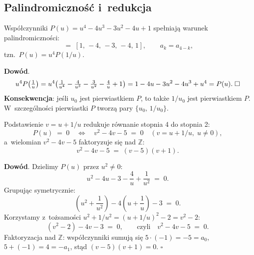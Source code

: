 \subsection{Palindromiczno\'s\'c i~redukcja}\label{app:T2-palindrome}

\begin{proposition}\label{prop:T2-palindrome}
Wsp\'o\l{}czynniki $P(u) = u^4 - 4u^3 - 3u^2 - 4u + 1$ spe\l{}niaj\k{a}
warunek palindromiczno\'sci:
\begin{equation}
  [a_4, a_3, a_2, a_1, a_0] \;=\; [1,\,-4,\,-3,\,-4,\,1],
  \qquad a_k = a_{4-k},
\end{equation}
tzn.\ $P(u) = u^4 P(1/u)$.

\textbf{Dow\'od}.
\[
  u^4 P\!\left(\tfrac{1}{u}\right)
    = u^4\!\left(\tfrac{1}{u^4} - \tfrac{4}{u^3} - \tfrac{3}{u^2}
      - \tfrac{4}{u} + 1\right)
    = 1 - 4u - 3u^2 - 4u^3 + u^4
    = P(u). \;\hfill\square
\]
\textbf{Konsekwencja}: je\'sli $u_0$ jest pierwiastkiem $P$, to tak\.ze
$1/u_0$ jest pierwiastkiem $P$.
W~szczeg\'olno\'sci pierwiastki $P$ tworz\k{a} pary
$\{u_0,\, 1/u_0\}$.
\end{proposition}

\begin{theorem}\label{thm:T2-reduction}
Podstawienie $v = u + 1/u$ redukuje r\'ownanie stopnia 4 do stopnia 2:
\begin{equation}\label{eq:T2-vred}
  P(u) \;=\; 0 \quad\Longleftrightarrow\quad
  v^2 - 4v - 5 \;=\; 0
  \quad (v = u + 1/u,\; u \neq 0),
\end{equation}
a~wielomian $v^2-4v-5$ faktoryzuje si\k{e} nad $\mathbb{Z}$:
\begin{equation}\label{eq:T2-vfactor}
  v^2 - 4v - 5 \;=\; (v-5)(v+1).
\end{equation}

\textbf{Dow\'od}.
Dzielimy $P(u)$ przez $u^2 \neq 0$:
\[
  u^2 - 4u - 3 - \frac{4}{u} + \frac{1}{u^2} \;=\; 0.
\]
Grupuj\k{a}c symetrycznie:
\[
  \left(u^2 + \frac{1}{u^2}\right) - 4\!\left(u + \frac{1}{u}\right) - 3
  \;=\; 0.
\]
Korzystamy z~to\.zsamo\'sci $u^2+1/u^2 = (u+1/u)^2 - 2 = v^2-2$:
\[
  (v^2 - 2) - 4v - 3 \;=\; 0,
  \qquad\text{czyli}\quad
  v^2 - 4v - 5 \;=\; 0.
\]
Faktoryzacja nad $\mathbb{Z}$: wsp\'o\l{}czynniki sumuj\k{a} si\k{e}
$5 \cdot (-1) = -5 = a_0$, $5 + (-1) = 4 = -a_1$, st\k{a}d
$(v-5)(v+1) = 0$.
\hfill$\square$
\end{theorem}

